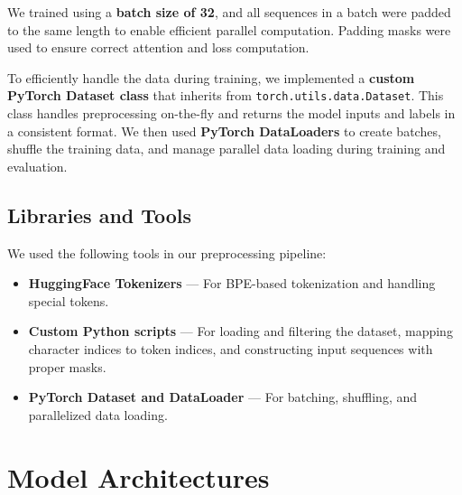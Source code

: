 \documentclass[runningheads]{llncs}
\begin{document}
We trained using a \textbf{batch size of 32}, and all sequences in a batch were padded to the same length to enable efficient parallel computation. Padding masks were used to ensure correct attention and loss computation.

To efficiently handle the data during training, we implemented a \textbf{custom PyTorch Dataset class} that inherits from \texttt{torch.utils.data.Dataset}. This class handles preprocessing on-the-fly and returns the model inputs and labels in a consistent format. We then used \textbf{PyTorch DataLoaders} to create batches, shuffle the training data, and manage parallel data loading during training and evaluation.

\subsection{Libraries and Tools}

We used the following tools in our preprocessing pipeline:
\begin{itemize}
    \item \textbf{HuggingFace Tokenizers} --- For BPE-based tokenization and handling special tokens.
    \item \textbf{Custom Python scripts} --- For loading and filtering the dataset, mapping character indices to token indices, and constructing input sequences with proper masks.
    \item \textbf{PyTorch Dataset and DataLoader} --- For batching, shuffling, and parallelized data loading.
\end{itemize}

\section{Model Architectures}
\end{document}
